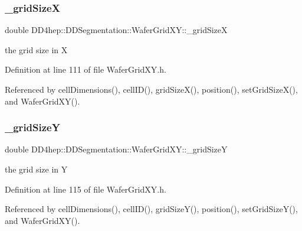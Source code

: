 \subsubsection{\texorpdfstring{\+\_\+grid\+SizeX}{\_gridSizeX}}
{\footnotesize\ttfamily double D\+D4hep\+::\+D\+D\+Segmentation\+::\+Wafer\+Grid\+X\+Y\+::\+\_\+grid\+SizeX\hspace{0.3cm}{\ttfamily [protected]}}



the grid size in X 



Definition at line 111 of file Wafer\+Grid\+X\+Y.\+h.



Referenced by cell\+Dimensions(), cell\+I\+D(), grid\+Size\+X(), position(), set\+Grid\+Size\+X(), and Wafer\+Grid\+X\+Y().

\hypertarget{class_d_d4hep_1_1_d_d_segmentation_1_1_wafer_grid_x_y_ae68069d981e55954dc25e9fbc8cc2e11}{}\label{class_d_d4hep_1_1_d_d_segmentation_1_1_wafer_grid_x_y_ae68069d981e55954dc25e9fbc8cc2e11} 
\subsubsection{\texorpdfstring{\+\_\+grid\+SizeY}{\_gridSizeY}}
{\footnotesize\ttfamily double D\+D4hep\+::\+D\+D\+Segmentation\+::\+Wafer\+Grid\+X\+Y\+::\+\_\+grid\+SizeY\hspace{0.3cm}{\ttfamily [protected]}}



the grid size in Y 



Definition at line 115 of file Wafer\+Grid\+X\+Y.\+h.



Referenced by cell\+Dimensions(), cell\+I\+D(), grid\+Size\+Y(), position(), set\+Grid\+Size\+Y(), and Wafer\+Grid\+X\+Y().

\hypertarget{class_d_d4hep_1_1_d_d_segmentation_1_1_wafer_grid_x_y_ae4552eda8798fc3fb8c4bd155a7ee6eb}{}\label{class_d_d4hep_1_1_d_d_segmentation_1_1_wafer_grid_x_y_ae4552eda8798fc3fb8c4bd155a7ee6eb} 
